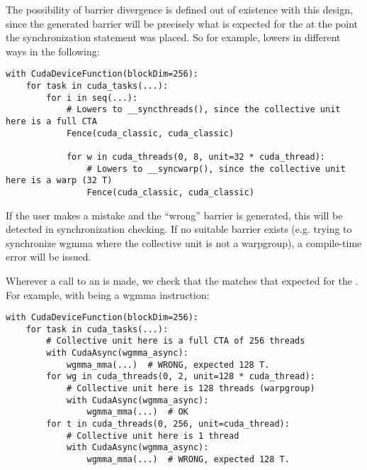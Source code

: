 \filbreak
{}
The possibility of barrier divergence is defined out of existence with this design, since the generated barrier will be precisely what is expected for the  at the point the synchronization statement was placed.
So for example,  lowers in different ways in the following:
{\color{lightttColor}
\begin{verbatim}
with CudaDeviceFunction(blockDim=256):
    for task in cuda_tasks(...):
        for i in seq(...):
            # Lowers to __syncthreads(), since the collective unit here is a full CTA
            Fence(cuda_classic, cuda_classic)

            for w in cuda_threads(0, 8, unit=32 * cuda_thread):
                # Lowers to __syncwarp(), since the collective unit here is a warp (32 T)
                Fence(cuda_classic, cuda_classic)
\end{verbatim}
}

\filbreak
If the user makes a mistake and the ``wrong'' barrier is generated, this will be detected in synchronization checking.
If no suitable barrier exists (e.g. trying to synchronize wgmma where the collective unit is not a warpgroup), a compile-time error will be issued.

\filbreak
{}
Wherever a call to an  is made, we check that the  matches that expected for the .
For example, with  being a wgmma instruction:
{\color{lightttColor}
\begin{verbatim}
with CudaDeviceFunction(blockDim=256):
    for task in cuda_tasks(...):
        # Collective unit here is a full CTA of 256 threads
        with CudaAsync(wgmma_async):
            wgmma_mma(...)  # WRONG, expected 128 T.
        for wg in cuda_threads(0, 2, unit=128 * cuda_thread):
            # Collective unit here is 128 threads (warpgroup)
            with CudaAsync(wgmma_async):
                wgmma_mma(...)  # OK
        for t in cuda_threads(0, 256, unit=cuda_thread):
            # Collective unit here is 1 thread
            with CudaAsync(wgmma_async):
                wgmma_mma(...)  # WRONG, expected 128 T.
\end{verbatim}
}


